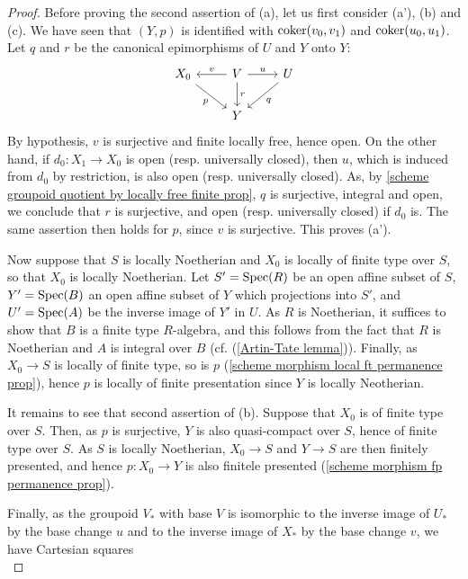 \begin{proof}
Before proving the second assertion of (a), let us first consider (a'), (b) and (c). We have seen that $(Y,p)$ is identified with $\operatorname{coker}(v_0,v_1)$ and $\operatorname{coker}(u_0,u_1)$. Let $q$ and $r$ be the canonical epimorphisms of $U$ and $Y$ onto $Y$:
\begin{equation}\label{scheme groupoid quasi-section lemma-1}
\begin{tikzcd}
X_0\ar[rd,swap,"p"]&V\ar[l,swap,"v"]\ar[d,"r"]\ar[r,"u"]&U\ar[ld,"q"]\\
&Y&
\end{tikzcd}
\end{equation}
By hypothesis, $v$ is surjective and finite locally free, hence open. On the other hand, if $d_0:X_1\to X_0$ is open (resp. universally closed), then $u$, which is induced from $d_0$ by restriction, is also open (resp. universally closed). As, by \cref{scheme groupoid quotient by locally free finite prop}, $q$ is surjective, integral and open, we conclude that $r$ is surjective, and open (resp. universally closed) if $d_0$ is. The same assertion then holds for $p$, since $v$ is surjective. This proves (a').\par
Now suppose that $S$ is locally Noetherian and $X_0$ is locally of finite type over $S$, so that $X_0$ is locally Noetherian. Let $S'=\mathrm{Spec}(R)$ be an open affine subset of $S$, $Y'=\mathrm{Spec}(B)$ an open affine subset of $Y$ which projections into $S'$, and $U'=\mathrm{Spec}(A)$ be the inverse image of $Y'$ in $U$. As $R$ is Noetherian, it suffices to show that $B$ is a finite type $R$-algebra, and this follows from the fact that $R$ is Noetherian and $A$ is integral over $B$ (cf. (\ref{Artin-Tate lemma})). Finally, as $X_0\to S$ is locally of finite type, so is $p$ (\cref{scheme morphism local ft permanence prop}), hence $p$ is locally of finite presentation since $Y$ is locally Neotherian.\par
It remains to see that second assertion of (b). Suppose that $X_0$ is of finite type over $S$. Then, as $p$ is surjective, $Y$ is also quasi-compact over $S$, hence of finite type over $S$. As $S$ is locally Noetherian, $X_0\to S$ and $Y\to S$ are then finitely presented, and hence $p:X_0\to Y$ is also finitele presented (\cref{scheme morphism fp permanence prop}).\par
Finally, as the groupoid $V_*$ with base $V$ is isomorphic to the inverse image of $U_*$ by the base change $u$ and to the inverse image of $X_*$ by the base change $v$, we have Cartesian squares
\begin{equation}\label{scheme groupoid quasi-section lemma-2}

\end{equation}
\end{proof}
